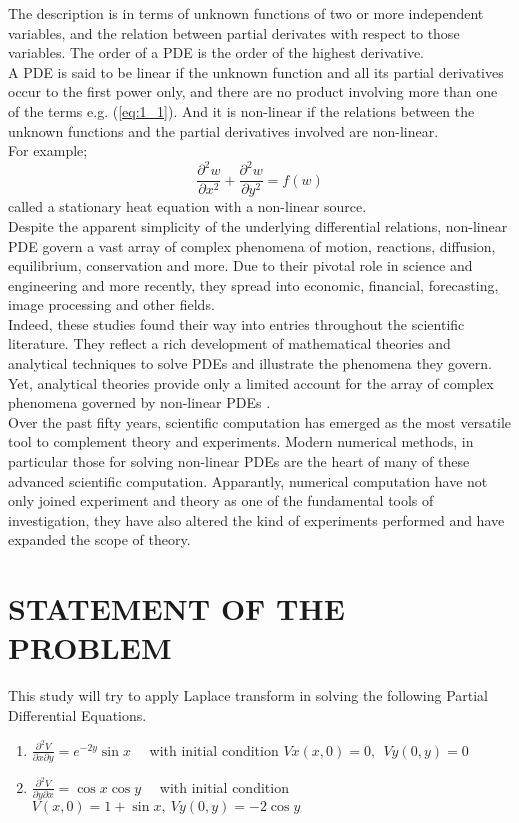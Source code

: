 \documentclass[11pt]{report}
\newcommand{\sps}{\\[0.2cm]}
\newcommand{\refn}[1]{(\ref{#1})}
\newcommand{\refx}[1]{\refn{eq:#1}}
\newcommand{\dsp}{\displaystyle}
\newcommand{\PDE}{PDE }
\newcommand{\PDEs}{PDEs }
\begin{document}
	The description is in terms of unknown functions of two or more independent variables, and the relation between partial derivates with respect to those variables. The order of a \PDE is the order of the highest derivative.\\
	
	A \PDE is said to be linear if the unknown function and all its partial derivatives occur to the first power only, and there are no product involving more than one of the terms e.g. \refx{1_1}. And it is non-linear if the relations between the unknown functions and the partial derivatives involved are non-linear.\sps
	For example;
	\begin{equation}
		\frac{\partial^2w}{\partial x^2}+\frac{\partial^2w}{\partial y^2} = f(w)
		\label{eq:1_2}
	\end{equation}
	called a stationary heat equation with a non-linear source.\sps
	
	Despite the apparent simplicity of the underlying differential relations, non-linear \PDE govern a vast array of complex phenomena of motion, reactions, diffusion, equilibrium, conservation and more. Due to their pivotal role in science and engineering and more recently, they spread into economic, financial, forecasting, image processing and other fields.\\
	
	Indeed, these studies found their way into entries throughout the scientific literature. They reflect a rich development of mathematical theories and analytical techniques to solve \PDEs  and illustrate the phenomena they govern. Yet, analytical theories provide only a limited account for the array of complex phenomena governed by non-linear \PDEs.\\
	
	Over the past fifty years, scientific computation has emerged as the most versatile tool to complement theory and experiments. Modern numerical methods, in particular those for solving non-linear \PDEs are the heart of many of these advanced scientific computation. Apparantly, numerical computation have not only joined experiment and theory as one of the fundamental tools of investigation, they have also altered the kind of experiments performed and have expanded the scope of theory.
	
	\section{STATEMENT OF THE PROBLEM}
	This study will try to apply Laplace transform in solving the following Partial Differential Equations.\\
	\begin{enumerate}
		\item $\dsp \frac{\partial^2 V}{\partial x\partial y} = e^{-2y}\sin x$ ~~with initial condition $Vx(x,0)=0, ~~Vy(0,y) =0$
		\item $\dsp \frac{\partial^2 V}{\partial y \partial x}= \cos x \cos y$~~ with initial condition $V(x,0)=1+\sin x, ~ Vy(0,y)=-2\cos y$
	\end{enumerate}
\end{document}
